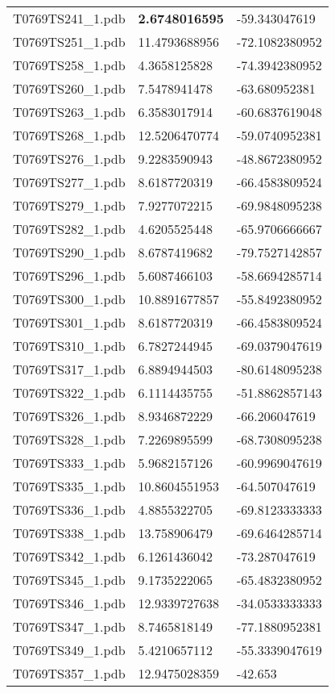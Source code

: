 \begin{longtable}{lll}
T0769TS241\_1.pdb & \textbf{2.6748016595} & -59.343047619\\
T0769TS251\_1.pdb & 11.4793688956 & -72.1082380952\\
T0769TS258\_1.pdb & 4.3658125828 & -74.3942380952\\
T0769TS260\_1.pdb & 7.5478941478 & -63.680952381\\
T0769TS263\_1.pdb & 6.3583017914 & -60.6837619048\\
T0769TS268\_1.pdb & 12.5206470774 & -59.0740952381\\
T0769TS276\_1.pdb & 9.2283590943 & -48.8672380952\\
T0769TS277\_1.pdb & 8.6187720319 & -66.4583809524\\
T0769TS279\_1.pdb & 7.9277072215 & -69.9848095238\\
T0769TS282\_1.pdb & 4.6205525448 & -65.9706666667\\
T0769TS290\_1.pdb & 8.6787419682 & -79.7527142857\\
T0769TS296\_1.pdb & 5.6087466103 & -58.6694285714\\
T0769TS300\_1.pdb & 10.8891677857 & -55.8492380952\\
T0769TS301\_1.pdb & 8.6187720319 & -66.4583809524\\
T0769TS310\_1.pdb & 6.7827244945 & -69.0379047619\\
T0769TS317\_1.pdb & 6.8894944503 & -80.6148095238\\
T0769TS322\_1.pdb & 6.1114435755 & -51.8862857143\\
T0769TS326\_1.pdb & 8.9346872229 & -66.206047619\\
T0769TS328\_1.pdb & 7.2269895599 & -68.7308095238\\
T0769TS333\_1.pdb & 5.9682157126 & -60.9969047619\\
T0769TS335\_1.pdb & 10.8604551953 & -64.507047619\\
T0769TS336\_1.pdb & 4.8855322705 & -69.8123333333\\
T0769TS338\_1.pdb & 13.758906479 & -69.6464285714\\
T0769TS342\_1.pdb & 6.1261436042 & -73.287047619\\
T0769TS345\_1.pdb & 9.1735222065 & -65.4832380952\\
T0769TS346\_1.pdb & 12.9339727638 & -34.0533333333\\
T0769TS347\_1.pdb & 8.7465818149 & -77.1880952381\\
T0769TS349\_1.pdb & 5.4210657112 & -55.3339047619\\
T0769TS357\_1.pdb & 12.9475028359 & -42.653\\

\end{longtable}

